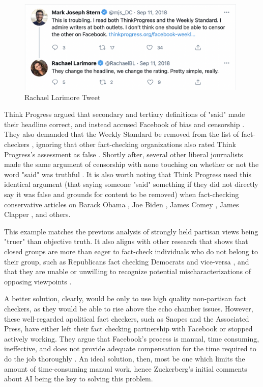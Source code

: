 \documentclass[preprint,review,12pt]{elsarticle}
\begin{document}
 \begin{figure}[h]
    \centering
    \includegraphics[width=11cm]{Larimore Tweet.png}
    \caption{Rachael Larimore Tweet \cite{larimore2018tweet}}
    \label{fig:Rachael Larimore Tweet, Sep 11, 2018}
\end{figure} 
Think Progress argued that secondary and tertiary definitions of "said" made their headline correct, and instead accused Facebook of bias and censorship \cite{legum2018tweet}. They also demanded that the Weekly Standard be removed from the list of fact-checkers \cite{Millhiser2018Facebook}, ignoring that other fact-checking organizations also rated Think Progress's assessment as false \cite{gore2018kavanaugh,tobias2018kavanaugh}.
Shortly after, several other liberal journalists made the same argument of censorship with none touching on whether or not the word "said" was truthful \cite{froomkin2018tweet,grim2018tweet,beutler2018tweet}. It is also worth noting that Think Progress used this identical argument (that saying someone "said" something if they did not directly say it was false and grounds for content to be removed) when fact-checking conservative articles on Barack Obama \cite{legum2008context}, Joe Biden \cite{volsky2016biden}, James Comey \cite{israel2018rnc}, James Clapper \cite{lerner2015cruz}, and others. 
 
 This example matches the previous analysis of strongly held partisan views being "truer" than objective truth. It also aligns with other research that shows that closed groups are more than eager to fact-check individuals who do not belong to their group, such as Republicans fact checking Democrats and vice-versa \cite{shin2017partisan,iyengar2015fear}, and that they are unable or unwilling to recognize potential mischaracterizations of opposing viewpoints \cite{pennycook2019lazy,vargo2018agenda}. 
 
A better solution, clearly, would be only to use high quality non-partisan fact checkers, as they would be able to rise above the echo chamber issues. However, these well-regarded apolitical fact checkers, such as Snopes and the Associated Press, have either left their fact checking partnership with Facebook or stopped actively working. They argue that Facebook's process is manual, time consuming, ineffective, and does not provide adequate compensation for the time required to do the job thoroughly \cite{green2019message,coldeway2019update}. An ideal solution, then, most be one which limits the amount of time-consuming manual work, hence Zuckerberg's initial comments about AI being the key to solving this problem.
\end{document}
